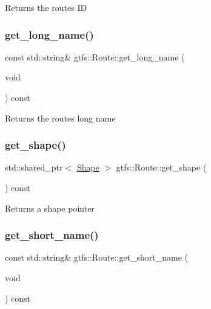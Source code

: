 \begin{DoxyReturn}{Returns}
the route\textquotesingle{}s ID 
\end{DoxyReturn}
\mbox{\label{classgtfs_1_1Route_aa943d312f934a91c3a56aec19d51cc90}} 
\subsubsection{\texorpdfstring{get\+\_\+long\+\_\+name()}{get\_long\_name()}}
{\footnotesize\ttfamily const std\+::string\& gtfs\+::\+Route\+::get\+\_\+long\+\_\+name (\begin{DoxyParamCaption}\item[{void}]{ }\end{DoxyParamCaption}) const\hspace{0.3cm}{\ttfamily [inline]}}

\begin{DoxyReturn}{Returns}
the route\textquotesingle{}s long name 
\end{DoxyReturn}
\mbox{\label{classgtfs_1_1Route_a4d3d7b29be342ae806041801327762a8}} 
\subsubsection{\texorpdfstring{get\+\_\+shape()}{get\_shape()}}
{\footnotesize\ttfamily std\+::shared\+\_\+ptr$<$ \hyperlink{classgtfs_1_1Shape}{Shape} $>$ gtfs\+::\+Route\+::get\+\_\+shape (\begin{DoxyParamCaption}{ }\end{DoxyParamCaption}) const}

\begin{DoxyReturn}{Returns}
a shape pointer 
\end{DoxyReturn}
\mbox{\label{classgtfs_1_1Route_a2a0fcdf687d5e326b20c5043c9db874f}} 
\subsubsection{\texorpdfstring{get\+\_\+short\+\_\+name()}{get\_short\_name()}}
{\footnotesize\ttfamily const std\+::string\& gtfs\+::\+Route\+::get\+\_\+short\+\_\+name (\begin{DoxyParamCaption}\item[{void}]{ }\end{DoxyParamCaption}) const\hspace{0.3cm}{\ttfamily [inline]}}

